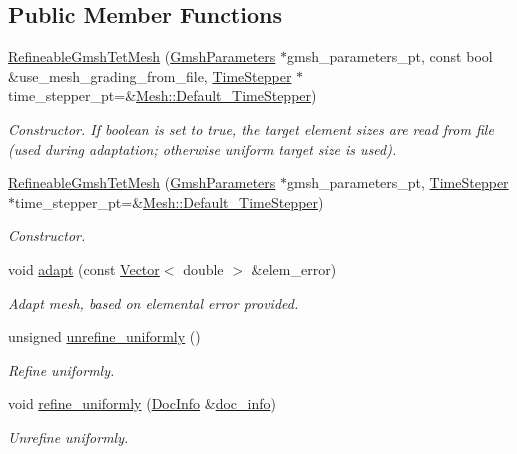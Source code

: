 \subsection*{Public Member Functions}
\begin{DoxyCompactItemize}
\item 
\hyperlink{classoomph_1_1RefineableGmshTetMesh_ae7f3a8f3481168bdb8039f6355b50cf0}{Refineable\+Gmsh\+Tet\+Mesh} (\hyperlink{classoomph_1_1GmshParameters}{Gmsh\+Parameters} $\ast$gmsh\+\_\+parameters\+\_\+pt, const bool \&use\+\_\+mesh\+\_\+grading\+\_\+from\+\_\+file, \hyperlink{classoomph_1_1TimeStepper}{Time\+Stepper} $\ast$time\+\_\+stepper\+\_\+pt=\&\hyperlink{classoomph_1_1Mesh_a12243d0fee2b1fcee729ee5a4777ea10}{Mesh\+::\+Default\+\_\+\+Time\+Stepper})
\begin{DoxyCompactList}\small\item\em Constructor. If boolean is set to true, the target element sizes are read from file (used during adaptation; otherwise uniform target size is used). \end{DoxyCompactList}\item 
\hyperlink{classoomph_1_1RefineableGmshTetMesh_ac2e041133fd618679af2594465ee4758}{Refineable\+Gmsh\+Tet\+Mesh} (\hyperlink{classoomph_1_1GmshParameters}{Gmsh\+Parameters} $\ast$gmsh\+\_\+parameters\+\_\+pt, \hyperlink{classoomph_1_1TimeStepper}{Time\+Stepper} $\ast$time\+\_\+stepper\+\_\+pt=\&\hyperlink{classoomph_1_1Mesh_a12243d0fee2b1fcee729ee5a4777ea10}{Mesh\+::\+Default\+\_\+\+Time\+Stepper})
\begin{DoxyCompactList}\small\item\em Constructor. \end{DoxyCompactList}\item 
void \hyperlink{classoomph_1_1RefineableGmshTetMesh_ad3ee00690d125ab8211f64d5c85dd3b9}{adapt} (const \hyperlink{classoomph_1_1Vector}{Vector}$<$ double $>$ \&elem\+\_\+error)
\begin{DoxyCompactList}\small\item\em Adapt mesh, based on elemental error provided. \end{DoxyCompactList}\item 
unsigned \hyperlink{classoomph_1_1RefineableGmshTetMesh_aa243fd14b5f168f541e5451766a9f68d}{unrefine\+\_\+uniformly} ()
\begin{DoxyCompactList}\small\item\em Refine uniformly. \end{DoxyCompactList}\item 
void \hyperlink{classoomph_1_1RefineableGmshTetMesh_a8d71e18a1181d79c475217cfab320674}{refine\+\_\+uniformly} (\hyperlink{classoomph_1_1DocInfo}{Doc\+Info} \&\hyperlink{classoomph_1_1RefineableMeshBase_a266f8b2a1499cc2ae7b24b19813923ee}{doc\+\_\+info})
\begin{DoxyCompactList}\small\item\em Unrefine uniformly. \end{DoxyCompactList}\end{DoxyCompactItemize}
